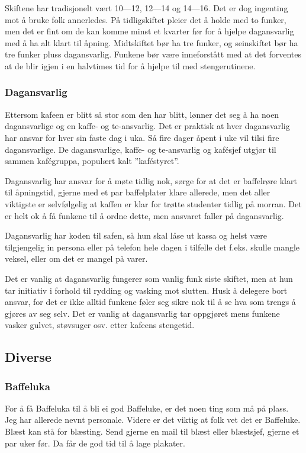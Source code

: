 Skiftene har tradisjonelt vært 10---12, 12---14 og 14---16. Det er dog ingenting
mot å bruke folk annerledes. På tidligskiftet pleier det å holde med to funker,
men det er fint om de kan komme minst et kvarter før for å hjelpe dagansvarlig
med å ha alt klart til åpning.  Midtskiftet bør ha tre funker, og seinskiftet
bør ha tre funker pluss dagansvarlig. Funkene bør være inneforstått med at det
forventes at de blir igjen i en halvtimes tid for å hjelpe til med
stengerutinene.

\subsubsection{Dagansvarlig} Ettersom kafeen er blitt så stor som den har blitt,
lønner det seg å ha noen dagansvarlige og en kaffe- og te-ansvarlig. Det er
praktisk at hver dagansvarlig har ansvar for hver sin faste dag i uka. Så fire
dager åpent i uke vil tilsi fire dagansvarlige. De dagansvarlige, kaffe- og
te-ansvarlig og kafésjef utgjør til sammen kafégruppa, populært kalt
''kaféstyret''.

Dagansvarlig har ansvar for å møte tidlig nok, sørge for at det er baffelrøre
klart til åpningstid, gjerne med et par baffelplater klare allerede, men det
aller viktigste er selvfølgelig at kaffen er klar for trøtte studenter tidlig på
morran. Det er helt ok å få funkene til å ordne dette, men ansvaret faller på
dagansvarlig.

Dagansvarlig har koden til safen, så hun skal låse ut kassa og helst være
tilgjengelig in persona eller på telefon hele dagen i tilfelle det f.eks. skulle
mangle veksel, eller om det er mangel på varer.

Det er vanlig at dagansvarlig fungerer som vanlig funk siste skiftet, men at hun
tar initiativ i forhold til rydding og vasking mot slutten. Husk å delegere bort
ansvar, for det er ikke alltid funkene føler seg sikre nok til å se hva som
trengs å gjøres av seg selv. Det er vanlig at dagansvarlig tar oppgjøret mens
funkene vasker gulvet, støvsuger osv. etter kafeens stengetid.

\subsection{Diverse} \subsubsection{Baffeluka} For å få Baffeluka til å bli ei
god Baffeluke, er det noen ting som må på plass. Jeg har allerede nevnt
personale. Videre er det viktig at folk vet det er Baffeluke. Blæst kan stå for
blæsting. Send gjerne en mail til blæst eller blæstsjef, gjerne et par uker før.
Da får de god tid til å lage plakater.


